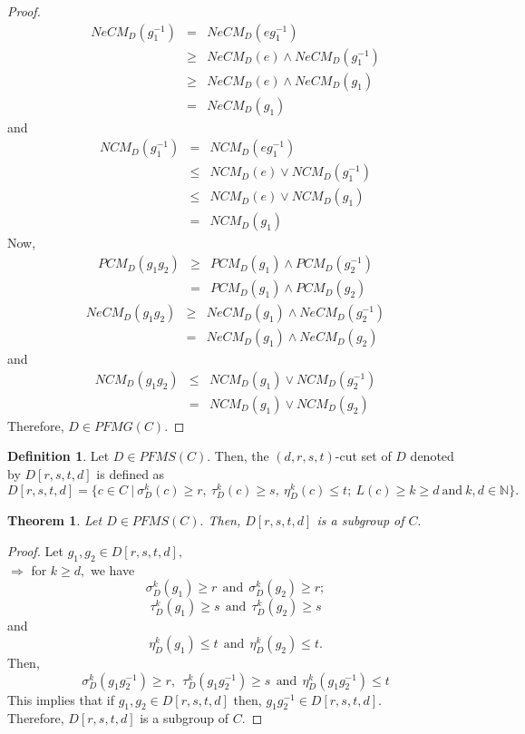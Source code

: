 \documentclass[12pt,letterpaper]{amsart}
\theoremstyle{plain}
\newtheorem{theorem}{Theorem}[section]
\theoremstyle{definition}
\newtheorem{definition}{Definition}[section]
\numberwithin{equation}{section}
\begin{document}
\begin{proof}
\begin{eqnarray*}
NeCM_{D}(g_1^{-1}) & = & NeCM_{D}(e g_1^{-1})\\
& \geq & NeCM_{D}(e) \wedge NeCM_{D}(g_1^{-1}) \\
& \geq & NeCM_{D}(e) \wedge NeCM_{D}(g_1)\\
& = & NeCM_{D}(g_1)
\end{eqnarray*}
and 
\begin{eqnarray*}
NCM_{D}(g_1^{-1}) & = & NCM_{D}(e g_1^{-1})\\
& \leq & NCM_{D}(e) \vee NCM_{D}(g_1^{-1}) \\
& \leq & NCM_{D}(e) \vee NCM_{D}(g_1)\\
& = & NCM_{D}(g_1)
\end{eqnarray*}
Now, \begin{eqnarray*}
PCM_{D}(g_1 g_2) & \geq & PCM_{D}(g_1) \wedge PCM_{D}(g_2^{-1})\\
& = & PCM_{D}(g_1) \wedge PCM_{D}(g_2) 
\end{eqnarray*}
\begin{eqnarray*}
NeCM_{D}(g_1 g_2) & \geq & NeCM_{D}(g_1) \wedge NeCM_{D}(g_2^{-1})\\
& = & NeCM_{D}(g_1) \wedge NeCM_{D}(g_2) 
\end{eqnarray*} and
\begin{eqnarray*}
NCM_{D}(g_1 g_2) & \leq & NCM_{D}(g_1) \vee NCM_{D}(g_2^{-1})\\
& = & NCM_{D}(g_1) \vee NCM_{D}(g_2) 
\end{eqnarray*}
Therefore, $D \in PFMG(C).$
\end{proof}

\begin{definition}
Let $D \in PFMS(C).$ Then, the $(d, r, s, t)$-cut set of $D$ denoted by $D[r, s, t, d]$ is defined as $$D[r, s, t, d] = \lbrace c \in C~|~\sigma_D^k(c)\geq r,~\tau_D^k(c) \geq s,~\eta_D^k(c) \leq t;~ L(c)\geq k \geq d~\text{and}~k, d \in \mathbb{N}  \rbrace.$$
\end{definition}

\begin{theorem}
Let $D \in PFMS(C).$ Then, $D[r, s, t, d]$ is a subgroup of $C.$
\end{theorem}

\begin{proof}
Let $g_1, g_2 \in D[r, s, t, d],$\\ $\Rightarrow$ for $k \geq d,$ we have $$\sigma_D^k(g_1)\geq r~~ \text{and}~~ \sigma_D^k(g_2)\geq r;$$ $$\tau_D^k(g_1)\geq s~~ \text{and}~~ \tau_D^k(g_2)\geq s$$ and $$\eta_D^k(g_1)\leq t~~ \text{and}~~ \eta_D^k(g_2)\leq t.$$ Then, $$\sigma_D^k(g_1 g_2^{-1})\geq r, ~~ \tau_D^k(g_1 g_2^{-1})\geq s~~\text{and}~~ \eta_D^k(g_1 g_2^{-1})\leq t$$ This implies that if $g_1, g_2 \in D[r, s, t, d]$ then, $g_1 g_2^{-1} \in D[r, s, t, d].$\\ Therefore, $D[r, s, t, d]$ is a subgroup of $C.$
\end{proof}
\end{document}
